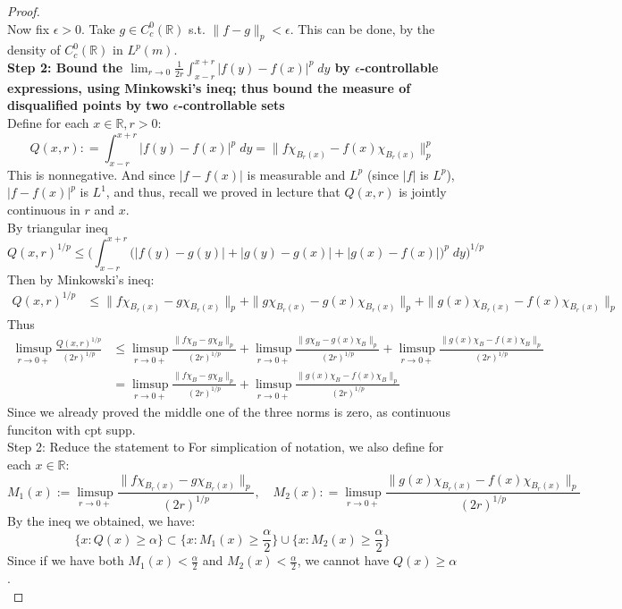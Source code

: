 \documentclass[lang=cn,11pt]{elegantbook}
\begin{document}
\begin{proof}
\[\]
Now fix $\epsilon > 0$.  Take $g\in C_c^0(\mathbb{R})$ s.t. $\|f-g\|_p < \epsilon$. This can be done, by the density of $ C_c^0(\mathbb{R})$ in $L^p(m)$.\\
\textbf{Step 2: Bound the $\lim_{r\to 0} \frac1{2r} \int_{x-r}^{x+r} |f(y)-f(x)|^p \;d y$ by $\epsilon$-controllable expressions, using Minkowski's ineq; thus bound the measure of disqualified points by two $\epsilon$-controllable sets}\\
Define for each $x\in \mathbb{R}, r>0$:
$$Q(x,r) : =   \int_{x - r}^{x + r} |f(y) - f(x)|^p \; dy = \| f \chi_{B_r(x)}-f(x)\chi_{B_r(x)}\|_{p}^p$$
This is nonnegative. And since $|f-f(x)|$ is measurable and $L^p$ (since $|f|$ is $L^p$), $|f-f(x)|^p$ is $L^1$, and thus, recall we proved in lecture that $Q(x,r)$ is jointly continuous in $r$ and $x$.\\
By triangular ineq \[Q(x,r)^{1/p} \leq    \bigg( \int_{x-r}^{x+r} \big(|f(y ) - g(y) | + |g(y) -g(x)| + |g(x) - f(x)|\big) ^p \; dy \bigg)^{1/p}\]
Then by Minkowski's ineq: 
\begin{align*}
    Q(x,r)^{1/p} &\leq  \| f \chi_{B_r(x)} - g  \chi_{B_r(x)}  \|_p + \| g \chi_{B_r(x)} -g(x)  \chi_{B_r(x)} \|_p + \| g(x)  \chi_{B_r(x)}  - f(x)  \chi_{B_r(x)}  \|_p 
\end{align*}
Thus \begin{align*}
    \limsup_{r\to 0+} \frac{Q(x,r)^{1/p}}{(2r)^{1/p}} & \leq \limsup_{r\to 0+}\frac{\| f \chi_{B} - g  \chi_{B}  \|_p }{(2r)^{1/p}}   +\limsup_{r\to 0+} \frac{\| g \chi_{B} -g(x)  \chi_{B} \|_p}{(2r)^{1/p}} +\limsup_{r\to 0+} \frac{\| g(x)  \chi_{B}  - f(x)  \chi_{B}  \|_p}{(2r)^{1/p}} \\
    & = \limsup_{r\to 0+}\frac{\| f \chi_{B} - g  \chi_{B}  \|_p }{(2r)^{1/p}}    +\limsup_{r\to 0+} \frac{\| g(x)  \chi_{B}  - f(x)  \chi_{B}  \|_p}{(2r)^{1/p}} 
\end{align*}
Since we already proved the middle one of the three norms is zero, as continuous funciton with cpt supp.\\
Step 2: Reduce the statement to 
For simplication of notation, we also define for each $x\in \mathbb{R}$: \[
M_1(x) :=  \limsup_{r\to 0+}\frac{\| f \chi_{B_r(x)} - g  \chi_{B_r(x)}  \|_p }{(2r)^{1/p}},\quad M_2(x) : = \limsup_{r\to 0+} \frac{\| g(x)  \chi_{B_r(x)}  - f(x)  \chi_{B_r(x)}  \|_p}{(2r)^{1/p}} 
\]
By the ineq we obtained, we have:
\[
\{ x : Q(x) \geq \alpha\} \subset  \{x: M_1(x) \geq \frac{\alpha}{2} \}   \cup \{x: M_2(x) \geq \frac{\alpha}{2} \}
\]
Since if we have both $M_1(x) < \frac{\alpha}{2}$ and $M_2(x) < \frac{\alpha}{2}$, we cannot have $Q(x) \geq \alpha$.\\

\end{proof}
\end{document}
